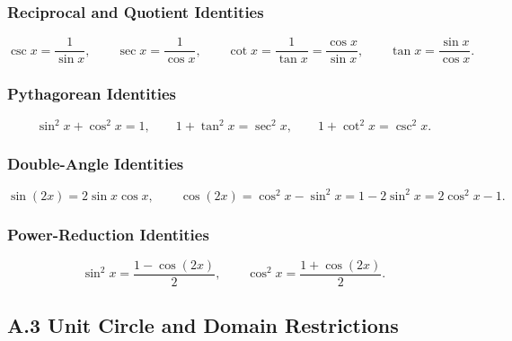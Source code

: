 \documentclass[10pt]{article}
\begin{document}
\subsubsection*{Reciprocal and Quotient Identities}
\[
\csc x = \frac{1}{\sin x}, \qquad
\sec x = \frac{1}{\cos x}, \qquad
\cot x = \frac{1}{\tan x} = \frac{\cos x}{\sin x}, \qquad
\tan x = \frac{\sin x}{\cos x}.
\]

\subsubsection*{Pythagorean Identities}
\[
\sin^2 x + \cos^2 x = 1, \qquad
1 + \tan^2 x = \sec^2 x, \qquad
1 + \cot^2 x = \csc^2 x.
\]

\subsubsection*{Double-Angle Identities}
\[
\sin(2x) = 2\sin x\cos x, \qquad
\cos(2x) = \cos^2 x - \sin^2 x = 1 - 2\sin^2 x = 2\cos^2 x - 1.
\]

\subsubsection*{Power-Reduction Identities}
\[
\sin^2 x = \frac{1 - \cos(2x)}{2}, \qquad
\cos^2 x = \frac{1 + \cos(2x)}{2}.
\]

\bigskip

\subsection*{A.3 \quad Unit Circle and Domain Restrictions}
\end{document}
